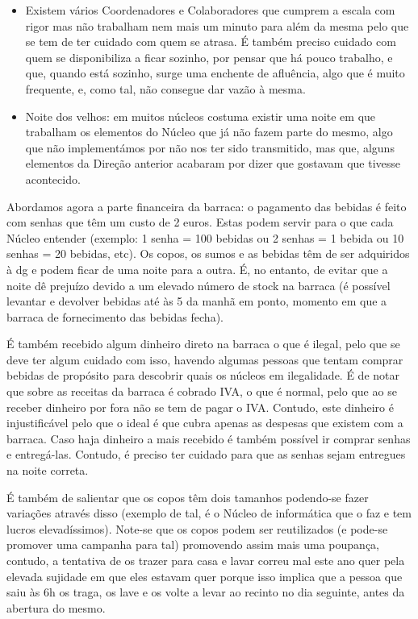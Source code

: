 \begin{itemize}
\begin{itemize}
        \item Existem vários Coordenadores e Colaboradores que cumprem a escala com rigor mas não trabalham nem mais um minuto para além da mesma pelo que se tem de ter cuidado com quem se atrasa. É também preciso cuidado com quem se disponibiliza a ficar sozinho, por pensar que há pouco trabalho, e que, quando está sozinho, surge uma enchente de afluência, algo que é muito frequente, e, como tal, não consegue dar vazão à mesma.
        \item Noite dos velhos: em muitos núcleos costuma existir uma noite em que trabalham os elementos do Núcleo que já não fazem parte do mesmo, algo que não implementámos por não nos ter sido transmitido, mas que, alguns elementos da Direção anterior acabaram por dizer que gostavam que tivesse acontecido.
    \end{itemize}
\end{itemize}

Abordamos agora a parte financeira da barraca: o pagamento das bebidas é feito com senhas que têm um custo de 2 euros. Estas podem servir para o que cada Núcleo entender (exemplo: 1 senha = 100 bebidas ou 2 senhas = 1 bebida ou 10 senhas = 20 bebidas, etc). Os copos, os sumos e as bebidas têm de ser adquiridos à \acrshort{dg} e podem ficar de uma noite para a outra. É, no entanto, de evitar que a noite dê prejuízo devido a um elevado número de stock na barraca (é possível levantar e devolver bebidas até às 5 da manhã em ponto, momento em que a barraca de fornecimento das bebidas fecha).

{ %
    É também recebido algum dinheiro direto na barraca o que é ilegal, pelo que se deve ter algum cuidado com isso, havendo algumas pessoas que tentam comprar bebidas de propósito para descobrir quais os núcleos em ilegalidade. É de notar que sobre as receitas da barraca é cobrado IVA, o que é normal, pelo que ao se receber dinheiro por fora não se tem de pagar o IVA. Contudo, este dinheiro é injustificável pelo que o ideal é que cubra apenas as despesas que existem com a barraca. Caso haja dinheiro a mais recebido é também possível ir comprar senhas e entregá-las. Contudo, é preciso ter cuidado para que as senhas sejam entregues na noite correta.
}
{ %

}
É também de salientar que os copos têm dois tamanhos podendo-se fazer variações através disso (exemplo de tal, é o Núcleo de informática que o faz e tem lucros elevadíssimos). Note-se que os copos podem ser reutilizados (e pode-se promover uma campanha para tal) promovendo assim mais uma poupança, contudo, a tentativa de os trazer para casa e lavar correu mal este ano quer pela elevada sujidade em que eles estavam quer porque isso implica que a pessoa que saiu às 6h os traga, os lave e os volte a levar ao recinto no dia seguinte, antes da abertura do mesmo.

